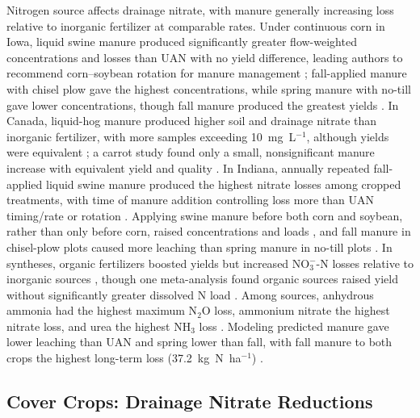 Nitrogen source affects drainage nitrate, with manure generally increasing loss relative to inorganic fertilizer at comparable rates. Under continuous corn in Iowa, liquid swine manure produced significantly greater flow-weighted concentrations and losses than UAN with no yield difference, leading authors to recommend corn--soybean rotation for manure management \parencite{Bakhsh2005}; fall-applied manure with chisel plow gave the highest concentrations, while spring manure with no-till gave lower concentrations, though fall manure produced the greatest yields \parencite{Bakhsh2007}. In Canada, liquid-hog manure produced higher soil and drainage nitrate than inorganic fertilizer, with more samples exceeding 10~mg~L$^{-1}$, although yields were equivalent \parencite{Elmi2005}; a carrot study found only a small, nonsignificant manure increase with equivalent yield and quality \parencite{Gordon2005}. In Indiana, annually repeated fall-applied liquid swine manure produced the highest nitrate losses among cropped treatments, with time of manure addition controlling loss more than UAN timing/rate or rotation \parencite{HernandezRamirez2011}. Applying swine manure before both corn and soybean, rather than only before corn, raised concentrations and loads \parencite{Dougherty2020}, and fall manure in chisel-plow plots caused more leaching than spring manure in no-till plots \parencite{Rekha2011}. In syntheses, organic fertilizers boosted yields but increased NO$_3^-$-N losses relative to inorganic sources \parencite{Liu2021}, though one meta-analysis found organic sources raised yield without significantly greater dissolved N load \parencite{Christianson2015b}. Among sources, anhydrous ammonia had the highest maximum N$_2$O loss, ammonium nitrate the highest nitrate loss, and urea the highest NH$_3$ loss \parencite{Chatterjee2020b}. Modeling predicted manure gave lower leaching than UAN and spring lower than fall, with fall manure to both crops the highest long-term loss (37.2~kg~N~ha$^{-1}$) \parencite{Malone2007,Malone2007b}.

\subsection{Cover Crops: Drainage Nitrate Reductions}

